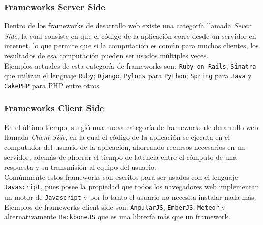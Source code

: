\subsubsection{Frameworks Server Side} %
\label{ssub:frameworks_server_side}
Dentro de los frameworks de desarrollo web existe una categoría llamada \emph{Sever Side}, la cual consiste en que el código de la aplicación corre desde un servidor en internet, lo que permite que si la computación es común para muchos clientes, los resultados de esa computación pueden ser usados múltiples veces.\\

Ejemplos actuales de esta categoría de frameworks son: \texttt{Ruby on Rails}\cite{rails}, \texttt{Sinatra}\cite{sinatra} que utilizan el lenguaje \texttt{Ruby}; \texttt{Django}\cite{django}, \texttt{Pylons}\cite{pylons} para \texttt{Python}; \texttt{Spring}\cite{spring} para \texttt{Java} y \texttt{CakePHP}\cite{cake} para PHP entre otros.

\subsubsection{Frameworks Client Side} %
\label{ssub:frameworks_client_side}
En el último tiempo, surgió una nueva categoría de frameworks de desarrollo web llamada \emph{Client Side}, en la cual el código de la aplicación se ejecuta en el computador del usuario de la aplicación, ahorrando recursos necesarios en un servidor, además de ahorrar el tiempo de latencia entre el cómputo de una respuesta y su transmisión al equipo del usuario.\\

Comúnmente estos frameworks son escritos para ser usados con el lenguaje \texttt{Javascript}, pues posee la propiedad que todos los navegadores web implementan un motor de \texttt{Javascript} y por lo tanto el usuario no necesita instalar nada más. Ejemplos de frameworks client side son: \texttt{AngularJS}\cite{angular}, \texttt{EmberJS}\cite{ember}, \texttt{Meteor}\cite{meteor} y alternativamente \texttt{BackboneJS}\cite{backbone} que es una librería más que un framework.


% 
% 
% 
